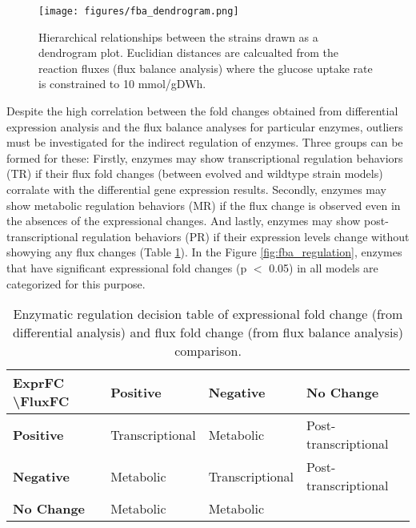 \begin{figure}[H]
  \begin{center}
  \texttt{[image: figures/fba\_dendrogram.png]}
  \caption[Hierarchical relationships between the strains drawn as a dendrogram plot. Euclidian distances are calcualted from the reaction fluxes (flux balance analysis) where the glucose uptake rate is constrained to 10 mmol/gDWh]{Hierarchical relationships between the strains drawn as a dendrogram plot. Euclidian distances are calcualted from the reaction fluxes (flux balance analysis) where the glucose uptake rate is constrained to 10 mmol/gDWh.}
  \label{fig:fba_dendrogram}
  \end{center}
\end{figure}

Despite the high correlation between the fold changes obtained from differential expression analysis and the flux balance analyses for particular enzymes, outliers must be investigated for the indirect regulation of enzymes. Three groups can be formed for these: Firstly, enzymes may show transcriptional regulation behaviors (TR) if their flux fold changes (between evolved and wildtype strain models) corralate with the differential gene expression results. Secondly, enzymes may show metabolic regulation behaviors (MR) if the flux change is observed even in the absences of the expressional changes. And lastly, enzymes may show post-transcriptional regulation behaviors (PR) if their expression levels change without showying any flux changes (Table \ref{table:regulation_table}). In the Figure \ref{fig:fba_regulation}, enzymes that have significant expressional fold changes (p $<$ 0.05) in all models are categorized for this purpose.

\baselineskip
\begin{table}[H]
\begin{center}
\caption[Enzymatic regulation decision table of expressional fold change (from differential analysis) and flux fold change (from flux balance analysis) comparison.]{Enzymatic regulation decision table of expressional fold change (from differential analysis) and flux fold change (from flux balance analysis) comparison.}
\baselineskip
\label{table:regulation_table}
\begin{tabular}{l|l|l|l|}
\cline{2-4}
\textbf{ExprFC \textbackslash FluxFC} & \textbf{Positive} & \textbf{Negative} & \textbf{No Change} \\ \hline
\multicolumn{1}{|l|}{\textbf{Positive}}  & Transcriptional & Metabolic       & Post-transcriptional \\ \hline
\multicolumn{1}{|l|}{\textbf{Negative}}  & Metabolic       & Transcriptional & Post-transcriptional \\ \hline
\multicolumn{1}{|l|}{\textbf{No Change}} & Metabolic       & Metabolic       &                      \\ \hline
\end{tabular}
\end{center}
\end{table}

